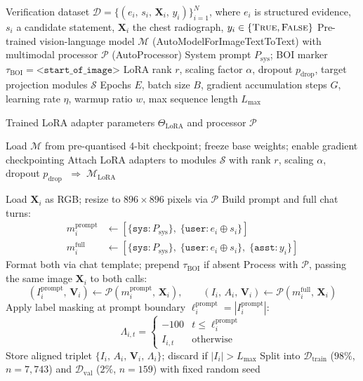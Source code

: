 \documentclass[12pt]{article}
\begin{document}
\setcounter{algorithm}{1}

\begin{algorithm}[H]
\small
\caption{Supervised Fine-tuning of a Multimodal LoRA Verifier}
\begin{algorithmic}[1]

\Require Verification dataset $\mathcal{D} = \{(e_i,\, s_i,\, \mathbf{X}_i,\, y_i)\}_{i=1}^{N}$, where $e_i$ is structured evidence, $s_i$ a candidate statement, $\mathbf{X}_i$ the chest radiograph, $y_i \in \{\textsc{True},\textsc{False}\}$
\Require Pre-trained vision-language model $\mathcal{M}$ (AutoModelForImageTextToText) with multimodal processor $\mathcal{P}$ (AutoProcessor)
\Require System prompt $P_{\text{sys}}$; BOI marker $\tau_{\text{BOI}}=\texttt{<start\_of\_image>}$
\Require LoRA rank $r$, scaling factor $\alpha$, dropout $p_{\text{drop}}$, target projection modules $\mathcal{S}$
\Require Epochs $E$, batch size $B$, gradient accumulation steps $G$, learning rate $\eta$, warmup ratio $w$, max sequence length $L_{\max}$

\Ensure Trained LoRA adapter parameters $\Theta_{\text{LoRA}}$ and processor $\mathcal{P}$

\State Load $\mathcal{M}$ from pre-quantised 4-bit checkpoint; freeze base weights; enable gradient checkpointing
\State Attach LoRA adapters to modules $\mathcal{S}$ with rank $r$, scaling $\alpha$, dropout $p_{\text{drop}}$ $\;\Rightarrow\;\mathcal{M}_{\text{LoRA}}$

    \State Load $\mathbf{X}_i$ as RGB; resize to $896{\times}896$ pixels via $\mathcal{P}$
    \State Build prompt and full chat turns:
    \begin{align*}
        m_i^{\text{prompt}} &\gets [\{\texttt{sys}: P_{\text{sys}}\},\;\{\texttt{user}: e_i \oplus s_i\}] \\
        m_i^{\text{full}}   &\gets [\{\texttt{sys}: P_{\text{sys}}\},\;\{\texttt{user}: e_i \oplus s_i\},\;\{\texttt{asst}: y_i\}]
    \end{align*}
    \State Format both via chat template; prepend $\tau_{\text{BOI}}$ if absent 
    \State Process with $\mathcal{P}$, passing the same image $\mathbf{X}_i$ to both calls:
    \[
        (I_i^{\text{prompt}},\,\mathbf{V}_i) \gets \mathcal{P}(m_i^{\text{prompt}},\,\mathbf{X}_i),
        \qquad
        (I_i,\,A_i,\,\mathbf{V}_i) \gets \mathcal{P}(m_i^{\text{full}},\,\mathbf{X}_i)
    \]
    \State Apply label masking at prompt boundary $\ell_i^{\text{prompt}} = |I_i^{\text{prompt}}|$:
    \[
        \Lambda_{i,t} =
        \begin{cases}
            -100    & t \leq \ell_i^{\text{prompt}} \\
            I_{i,t} & \text{otherwise}
        \end{cases}
    \]
    \State Store aligned triplet $\{I_i,\,A_i,\,\mathbf{V}_i,\,\Lambda_i\}$; discard if $|I_i| > L_{\max}$
\EndFor
\State Split into $\mathcal{D}_{\text{train}}$ ($98\%$, $n=7{,}743$) and $\mathcal{D}_{\text{val}}$ ($2\%$, $n=159$) with fixed random seed


\end{algorithmic}
\end{algorithm}
\end{document}
